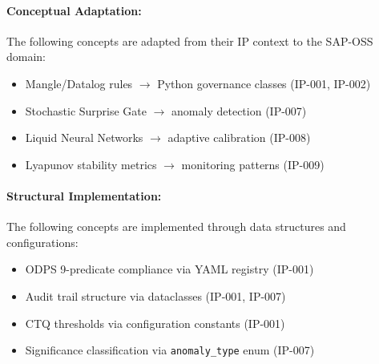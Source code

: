 \paragraph{Conceptual Adaptation:}
The following concepts are adapted from their IP context to the SAP-OSS domain:
\begin{itemize}[nosep]
    \item Mangle/Datalog rules $\rightarrow$ Python governance classes (IP-001, IP-002)
    \item Stochastic Surprise Gate $\rightarrow$ anomaly detection (IP-007)
    \item Liquid Neural Networks $\rightarrow$ adaptive calibration (IP-008)
    \item Lyapunov stability metrics $\rightarrow$ monitoring patterns (IP-009)
\end{itemize}

\paragraph{Structural Implementation:}
The following concepts are implemented through data structures and configurations:
\begin{itemize}[nosep]
    \item ODPS 9-predicate compliance via YAML registry (IP-001)
    \item Audit trail structure via dataclasses (IP-001, IP-007)
    \item CTQ thresholds via configuration constants (IP-001)
    \item Significance classification via \texttt{anomaly\_type} enum (IP-007)
\end{itemize}